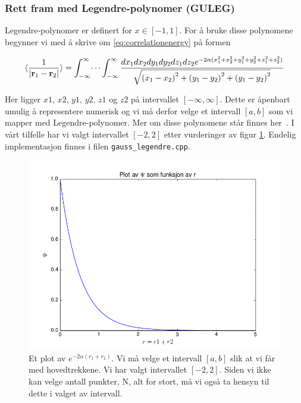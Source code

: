 \documentclass[11pt]{article}
\begin{document}
\subsubsection{Rett fram med Legendre-polynomer (GULEG)}
\label{subsubsec:gauss-legendre}
Legendre-polynomer er definert for $x\in[-1,1]$. For å bruke disse
polynomene begynner vi med å skrive om \eqref{eq:correlationenergy} på formen

\begin{align}\label{eq:xyzINT} 
  \langle \frac{1}{|{\bf r}_1-{\bf r}_2|} \rangle =
   \int_{-\infty}^{\infty} \dots \int_{-\infty}^{\infty}
   \frac{d{x}_1d{x}_2d{y}_1d{y}_2d{z}_1d{z}_2  
   e^{-2\alpha (x_1^2+x_2^2+y_1^2+y_2^2+z_1^2+z_2^2)}}{ \sqrt{{(x_1-x_2)}^2+{(y_1-y_2)}^2+{(y_1-y_2)}^2}}
\end{align}

Her ligger $x1$, $x2$, $y1$, $y2$, $z1$ og $z2$ på intervallet 
$[-\infty, \infty]$. Dette er åpenbart umulig å representere numerisk
og vi må derfor velge et intervall $[a,b]$ som vi mapper med Legendre-polynomer.
Mer om disse polynomene står finnes her~\cite{Lecture-notes}\cite{legendre-poly-wiki}. I vårt tilfelle
har vi valgt intervallet $[-2,2]$ etter vurderinger av figur
\ref{fig:PSI}. Endelig implementasjon finnes i filen \texttt{gauss\_legendre.cpp}.

\begin{figure}[ht]
  \centering
  \includegraphics[scale=0.7]{../fig/psiPlot.png}
  \caption{\label{fig:PSI} Et plot av  $e^{-2\alpha (r_1+r_2)}$. Vi må velge
et intervall $[a,b]$ slik at vi får med hovedtrekkene. Vi har valgt 
intervallet $[-2,2]$. Siden vi ikke kan velge antall punkter, N,
alt for stort, må vi også ta hensyn til dette i valget av intervall.}
\end{figure}
\end{document}

